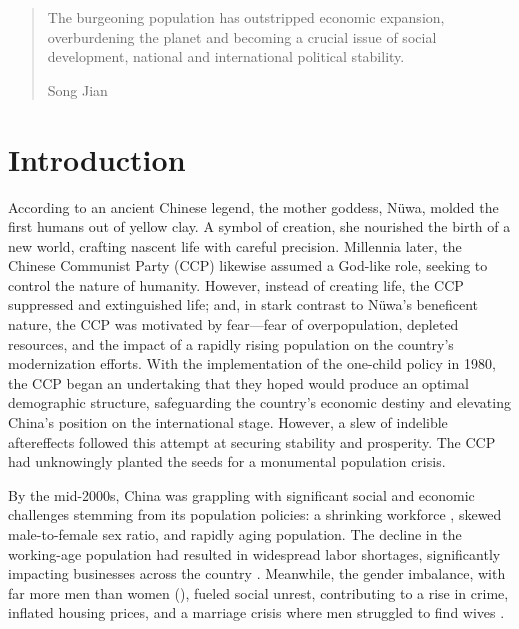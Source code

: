 
\begin{quote}
The burgeoning population has outstripped economic expansion, overburdening the planet and becoming a crucial issue of social development, national and international political stability.

\hfill Song Jian \autocite[p.\ 11]{SongKongYu1988}
\end{quote}

\section{Introduction}

According to an ancient Chinese legend, the mother goddess, Nüwa, molded the first humans out of yellow clay. A symbol of creation, she nourished the birth of a new world, crafting nascent life with careful precision. Millennia later, the Chinese Communist Party (CCP) likewise assumed a God-like role, seeking to control the nature of humanity. However, instead of creating life, the CCP suppressed and extinguished life; and, in stark contrast to Nüwa's beneficent nature, the CCP was motivated by fear---fear of overpopulation, depleted resources, and the impact of a rapidly rising population on the country's modernization efforts. With the implementation of the one-child policy in 1980, the CCP began an undertaking that they hoped would produce an optimal demographic structure, safeguarding the country's economic destiny and elevating China’s position on the international stage. However, a slew of indelible aftereffects followed this attempt at securing stability and prosperity. The CCP had unknowingly planted the seeds for a monumental population crisis.

By the mid-2000s, China was grappling with significant social and economic challenges stemming from its population policies: a shrinking workforce \autocite[p.\ 356]{White2016PopulationPolicyContext}, skewed male-to-female sex ratio, and rapidly aging population. The decline in the working-age population had resulted in widespread labor shortages, significantly impacting businesses across the country \autocite{SCMP2022WorkerShortages}. Meanwhile, the gender imbalance, with far more men than women (\cites[p.\ 117]{WangEtAl2016AJS}{CameronMengZhang2018}[pp.\ 169--186]{WeiZhangLiu2017}{Hodges2024HousingMarket}), fueled social unrest, contributing to a rise in crime, inflated housing prices, and a marriage crisis where men struggled to find wives \autocite{Fong2016OneChild}.

